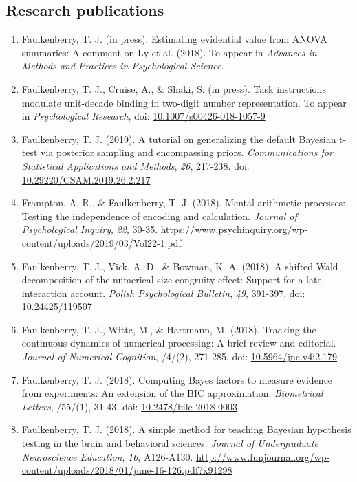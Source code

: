 \documentclass[article,10pt]{article}
\begin{document}
\subsection*{Research publications}
\label{sec:org78ace70}
\begin{enumerate}
\item Faulkenberry, T. J. (in press). Estimating evidential value from ANOVA summaries: A comment on Ly et al. (2018). To appear in \emph{Advances in Methods and Practices in Psychological Science}.
\item Faulkenberry, T. J., Cruise, A., \& Shaki, S. (in press). Task instructions modulate unit-decade binding in two-digit number representation. To appear in \emph{Psychological Research},  doi: \href{https://dx.doi.org/10.1007/s00426-018-1057-9}{10.1007/s00426-018-1057-9}
\item Faulkenberry, T. J. (2019). A tutorial on generalizing the default Bayesian t-test via posterior sampling and encompassing priors. \emph{Communications for Statistical Applications and Methods}, \emph{26}, 217-238. doi: \href{https://doi.org/10.29220/CSAM.2019.26.2.217}{10.29220/CSAM.2019.26.2.217}
\item Frampton, A. R., \& Faulkenberry, T. J. (2018). Mental arithmetic processes: Testing the independence of encoding and calculation. \emph{Journal of Psychological Inquiry}, \emph{22}, 30-35. \url{https://www.psychinquiry.org/wp-content/uploads/2019/03/Vol22-1.pdf}
\item Faulkenberry, T. J., Vick, A. D., \& Bowman, K. A. (2018). A shifted Wald decomposition of the numerical size-congruity effect: Support for a late interaction account. \emph{Polish Psychological Bulletin}, \emph{49}, 391-397. doi: \href{http://dx.doi.org/10.24425/119507}{10.24425/119507}
\item Faulkenberry, T. J., Witte, M., \& Hartmann, M. (2018). Tracking the continuous dynamics of numerical processing: A brief review and editorial. \emph{Journal of Numerical Cognition}, /4/(2), 271-285. doi: \href{http://dx.doi.org/10.5964/jnc.v4i2.179}{10.5964/jnc.v4i2.179}
\item Faulkenberry, T. J. (2018). Computing Bayes factors to measure evidence from experiments: An extension of the BIC approximation. \emph{Biometrical Letters}, /55/(1), 31-43. doi: \href{https://doi.org/10.2478/bile-2018-0003}{10.2478/bile-2018-0003}
\item Faulkenberry, T. J. (2018). A simple method for teaching Bayesian hypothesis testing in the brain and behavioral sciences. \emph{Journal of Undergraduate Neuroscience Education}, \emph{16}, A126-A130. \url{http://www.funjournal.org/wp-content/uploads/2018/01/june-16-126.pdf?x91298}

\end{enumerate}
\end{document}
